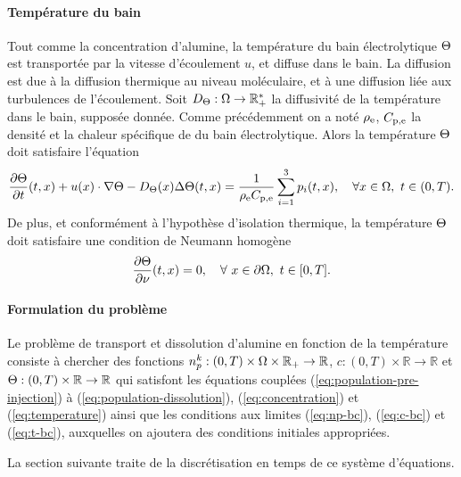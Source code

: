 \paragraph{Température du bain}
Tout comme la concentration d'alumine, la température du bain
électrolytique $\Theta$ est transportée par la vitesse
d'écoulement $u$, et diffuse dans le bain. La diffusion est due à la
diffusion thermique au niveau moléculaire, et à une diffusion liée aux
turbulences de l'écoulement. Soit $D_\Theta:\Omega\to\mathbb
R^*_+$ la diffusivité de la température dans le bain, supposée
donnée. Comme précédemment on a noté $\rho_\mathrm{e}$,
$C_{\mathrm{p,e}}$ la densité et la chaleur spécifique de du bain
électrolytique. Alors la température $\Theta$ doit satisfaire l'équation
\begin{equation}\label{eq:temperature}
\frac{\partial \Theta}{\partial t}(t, x) +
u(x)\cdot\nabla\Theta - D_\Theta(x)\Delta
\Theta(t, x) =
\frac{1}{\rho_\mathrm{e}C_{\mathrm{p,e}}}\sum_{i = 1}^{3}p_i(t, x),
\quad \forall x\in\Omega,\ t\in(0, T).
\end{equation}
De plus, et conformément à l'hypothèse d'isolation thermique, la température
$\Theta$ doit satisfaire une condition de Neumann homogène
\begin{equation}\label{eq:t-bc}
  \frac{\partial \Theta}{\partial \nu}(t, x) = 0, \quad
  \forall\ x\in\partial \Omega,\ t\in[0, T].
\end{equation}

\paragraph{Formulation du problème}
Le problème de transport et dissolution d'alumine en fonction de la
température consiste à chercher des fonctions $n_p^k:(0,
T)\times\Omega\times\mathbb R_+\to \mathbb R$, $c:(0, T)\times\mathbb R\to
\mathbb R$ et $\Theta:(0, T)\times\mathbb R\to\mathbb R$ qui
satisfont les équations couplées (\ref{eq:population-pre-injection}) à
(\ref{eq:population-dissolution}), (\ref{eq:concentration}) et
(\ref{eq:temperature}) ainsi que les conditions aux limites
(\ref{eq:np-bc}), (\ref{eq:c-bc}) et (\ref{eq:t-bc}), auxquelles on
ajoutera des conditions initiales appropriées.

\begin{remarque}

\end{remarque}

La section suivante traite de la discrétisation en temps de ce
système d'équations.
